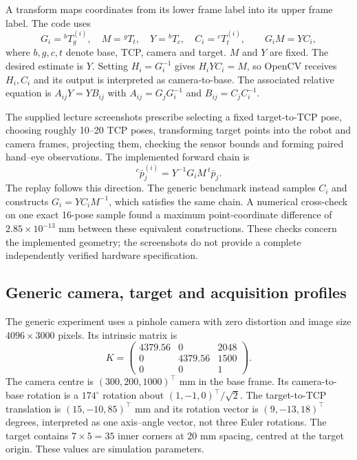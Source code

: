 \documentclass[12pt,a4paper]{article}
\begin{document}
A transform maps coordinates from its lower frame label into its upper frame label. The code uses
\begin{equation}\label{eq:loop}
G_i={}^{b}T_g^{(i)},\quad M={}^{g}T_t,\quad
Y={}^{b}T_c,\quad C_i={}^{c}T_t^{(i)},\qquad G_iM=YC_i,
\end{equation}
where $b,g,c,t$ denote base, TCP, camera and target. $M$ and $Y$ are fixed. The desired estimate is $Y$. Setting $H_i=G_i^{-1}$ gives $H_iYC_i=M$, so OpenCV receives $H_i,C_i$ and its output is interpreted as camera-to-base. The associated relative equation is $A_{ij}Y=YB_{ij}$ with $A_{ij}=G_jG_i^{-1}$ and $B_{ij}=C_jC_i^{-1}$. \cite{opencv,halconde}

The supplied lecture screenshots prescribe selecting a fixed target-to-TCP pose, choosing roughly 10--20 TCP poses, transforming target points into the robot and camera frames, projecting them, checking the sensor bounds and forming paired hand--eye observations. The implemented forward chain is
\begin{equation}\label{eq:forward}
{}^{c}\bar p_j^{(i)}=Y^{-1}G_iM\,{}^{t}\bar p_j.
\end{equation}
The replay follows this direction. The generic benchmark instead samples $C_i$ and constructs $G_i=YC_iM^{-1}$, which satisfies the same chain. A numerical cross-check on one exact 16-pose sample found a maximum point-coordinate difference of $2.85\times10^{-13}$ mm between these equivalent constructions. These checks concern the implemented geometry; the screenshots do not provide a complete independently verified hardware specification. \cite{lectureplan,experimentcode}

\subsection{Generic camera, target and acquisition profiles}
The generic experiment uses a pinhole camera with zero distortion and image size $4096\times3000$ pixels. Its intrinsic matrix is
\begin{equation}\label{eq:camera}
K=\begin{pmatrix}4379.56&0&2048\\0&4379.56&1500\\0&0&1\end{pmatrix}.
\end{equation}
The camera centre is $(300,200,1000)^\top$ mm in the base frame. Its camera-to-base rotation is a $174^\circ$ rotation about $(1,-1,0)^\top/\sqrt2$. The target-to-TCP translation is $(15,-10,85)^\top$ mm and its rotation vector is $(9,-13,18)^\top$ degrees, interpreted as one axis--angle vector, not three Euler rotations. The target contains $7\times5=35$ inner corners at 20 mm spacing, centred at the target origin. These values are simulation parameters. \cite{experimentcode}
\end{document}
